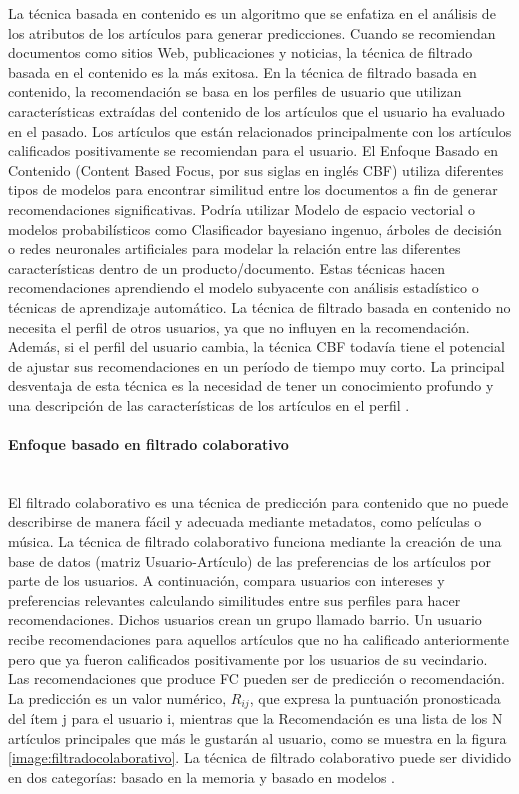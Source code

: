 La técnica basada en contenido es un algoritmo que se enfatiza en el análisis de los atributos de los artículos para generar predicciones. Cuando se recomiendan documentos como sitios Web, publicaciones y noticias, la técnica de filtrado basada en el contenido es la más exitosa. En la técnica de filtrado basada en contenido, la recomendación se basa en los perfiles de usuario que utilizan características extraídas del contenido de los artículos que el usuario ha evaluado en el pasado. Los artículos que están relacionados principalmente con los artículos calificados positivamente se recomiendan para el usuario. El Enfoque Basado en Contenido (Content Based Focus, por sus siglas en inglés CBF) utiliza diferentes tipos de modelos para encontrar similitud entre los documentos a fin de generar recomendaciones significativas. Podría utilizar Modelo de espacio vectorial o modelos probabilísticos como Clasificador bayesiano ingenuo, árboles de decisión o redes neuronales artificiales para modelar la relación entre las diferentes características dentro de un producto/documento. Estas técnicas hacen recomendaciones aprendiendo el modelo subyacente con análisis estadístico o técnicas de aprendizaje automático. La técnica de filtrado basada en contenido no necesita el perfil de otros usuarios, ya que no influyen en la recomendación. Además, si el perfil del usuario cambia, la técnica CBF todavía tiene el potencial de ajustar sus recomendaciones en un período de tiempo muy corto. La principal desventaja de esta técnica es la necesidad de tener un conocimiento profundo y una descripción de las características de los artículos en el perfil \cite{Isinkaye}. 

\paragraph{Enfoque basado en filtrado colaborativo} ~\\

El filtrado colaborativo es una técnica de predicción para contenido que no puede describirse de manera fácil y adecuada mediante metadatos, como películas o música. La técnica de filtrado colaborativo funciona mediante la creación de una base de datos (matriz Usuario-Artículo) de las preferencias de los artículos por parte de los usuarios. A continuación, compara usuarios con intereses y preferencias relevantes calculando similitudes entre sus perfiles para hacer recomendaciones. Dichos usuarios crean un grupo llamado barrio. Un usuario recibe recomendaciones para aquellos artículos que no ha calificado anteriormente pero que ya fueron calificados positivamente por los usuarios de su vecindario. Las recomendaciones que produce FC pueden ser de predicción o recomendación. La predicción es un valor numérico, $R_{ij}$, que expresa la puntuación pronosticada del ítem j para el usuario i, mientras que la Recomendación es una lista de los N artículos principales que más le gustarán al usuario, como se muestra en la figura \ref{image:filtradocolaborativo}. La técnica de filtrado colaborativo puede ser dividido en dos categorías: basado en la memoria y basado en modelos \cite{Isinkaye}. 

